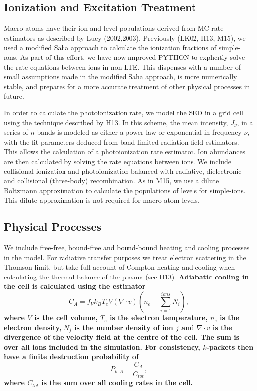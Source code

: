 \documentclass[useAMS,usenatbib]{mn2e_x}
\begin{document}
\subsection{Ionization and Excitation Treatment}

Macro-atoms have their ion and level populations derived from
MC rate estimators as described by Lucy (2002,2003). 
Previously (LK02, H13, M15), we used a modified Saha approach to 
calculate the ionization fractions
of simple-ions. As part of  this effort, we have 
now improved {\sc PYTHON} to explicitly solve the 
rate equations between ions in non-LTE. This dispenses with a number of small assumptions 
made in the modified Saha approach, is more numerically stable, and
prepares for a more accurate treatment of other physical processes in future. 

In order to calculate the photoionization rate, 
we model the SED in a grid cell using the technique described by H13. In this scheme,
the mean intensity, $J_{\nu}$, in a series of $n$ bands is modeled as either a power law or exponential
in frequency $\nu$, with the fit parameters deduced from band-limited radiation field estimators.
This allows the calculation of a photoionization rate estimator. Ion abundances are
then calculated by solving the rate equations between ions. We include collisional ionization and photoionization balanced with radiative, 
dielectronic and collisional (three-body) recombination.
As in M15, we use a dilute Boltzmann approximation to calculate 
the populations of levels for simple-ions. This dilute approximation 
is not required for macro-atom levels. 

\subsection{Physical Processes}

We include  free-free, bound-free and bound-bound heating
and cooling processes in the model. For radiative transfer purposes
we treat electron scattering in the Thomson limit, 
but take full account of Compton heating and cooling when
calculating the thermal balance of the plasma (see H13).
{\bf Adiabatic cooling in the cell is calculated using the estimator
\begin{equation}
C_{A} = f_V k_B T_e V (\nabla \cdot v) \left(n_e + \sum\limits_{i=1}^{ions} N_i\right),
\end{equation}
where $V$ is the cell volume, $T_e$ is the electron temperature,
$n_e$ is the electron density, $N_j$ is the number density of ion $j$
and $\nabla \cdot v$ is the divergence of the 
velocity field at the centre of the cell. The sum is over all ions 
included in the simulation.
For consistency, $k$-packets then have a finite 
destruction probability of 
\begin{equation}
P_{k,A} = \frac{C_{A}}{C_{tot}},
\end{equation}
where $C_{tot}$ is the sum over all cooling rates in the cell.
}
\end{document}
